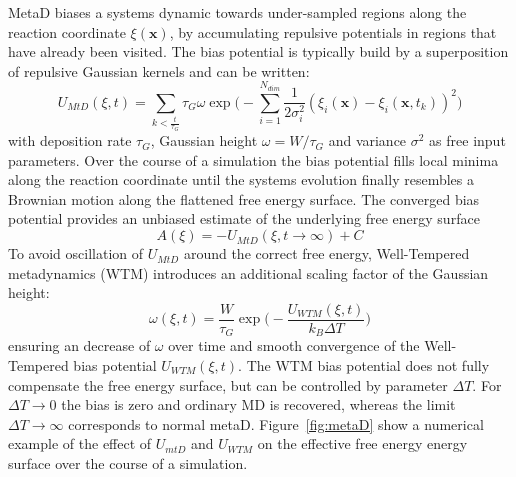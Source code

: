 MetaD biases a systems dynamic towards under-sampled regions along the reaction coordinate $\xi(\textbf{x})$, by accumulating repulsive potentials in regions that have already been visited. The bias potential is typically build by a superposition of repulsive Gaussian kernels and can be written:\autocite{barducci2011metadynamics}
\begin{equation}
  U_{MtD}(\xi,t)= \sum_{k<\frac{t}{\tau_G}} \tau_G \omega \exp\biggr(-\sum_{i=1}^{N_{dim}} \frac{1}{2\sigma_{i}^{2}} (\xi_{i}(\textbf{x})-\xi_{i}(\textbf{x},t_k))^2 \biggl)
  \label{eq:U_mtD}
\end{equation}
with deposition rate $\tau_G$, Gaussian height $\omega=W/\tau_G$ and variance $\sigma^2$ as free input parameters. Over the course of a simulation the bias potential fills local minima along the reaction coordinate until the systems evolution finally resembles a Brownian motion along the flattened free energy surface. The converged bias potential provides an unbiased estimate of the underlying free energy surface
\begin{equation}
  A(\xi) = -U_{MtD}(\xi, t \to \infty) + C
\end{equation}
To avoid oscillation of $U_{MtD}$ around the correct free energy, Well-Tempered metadynamics (WTM) introduces an additional scaling factor of the Gaussian height:\autocite{barducci2008well}
\begin{equation}
  \omega(\xi,t) = \frac{W}{\tau_G}\exp\biggl(-\frac{U_{WTM}(\xi,t)}{k_B \Delta T} \biggr)
  \label{eq:WTM}
\end{equation}
ensuring an decrease of $\omega$ over time and smooth convergence of the Well-Tempered bias potential $U_{WTM}(\xi,t)$. The WTM bias potential does not fully compensate the free energy surface, but can be controlled by parameter $\Delta T$. For $\Delta T \to 0$ the bias is zero and ordinary MD is recovered, whereas the limit $\Delta T \to \infty$ corresponds to normal metaD. Figure~\ref{fig:metaD} show a numerical example of the effect of $U_{mtD}$ and $U_{WTM}$ on the effective free energy energy surface over the course of a simulation.

